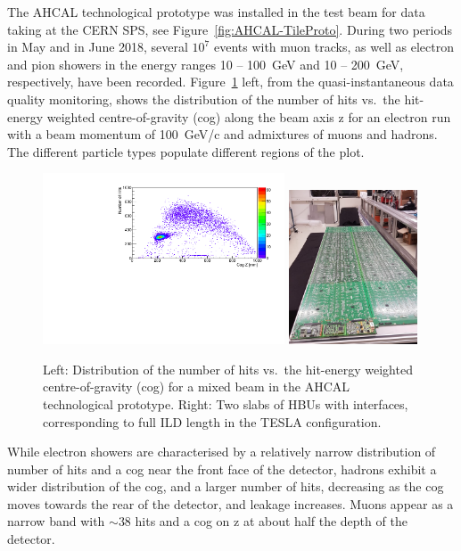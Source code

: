 The AHCAL technological prototype was installed in the test beam for data taking at the CERN SPS, see Figure~\ref{fig:AHCAL-TileProto}.
During two periods in May and in June 2018, several $10^7$ events with muon tracks, as well as electron and pion showers in the energy ranges  10 -- 100~GeV and 10 -- 200~GeV, respectively, have been recorded. 
Figure~\ref{fig:AHCAL-nhit-longslab} left, from the quasi-instantaneous data quality monitoring, shows the distribution of the number of hits vs.\ the hit-energy weighted centre-of-gravity (cog) along the beam axis z for an electron run with a beam momentum of 100~GeV/c and admixtures of muons and hadrons. The different particle types populate different regions of the plot.
\begin{figure}[hbt]
\centering
\includegraphics[width=0.64\textwidth]{Detector/fig/AHCAL-cogz_nhits.pdf}
\includegraphics[width=0.34\textwidth]{Detector/fig/AHCAL-LomgSlab.jpeg}
\caption{Left: Distribution of the number of hits vs.\ the hit-energy weighted centre-of-gravity (cog) for a mixed beam in the AHCAL technological prototype. Right: Two slabs of HBUs with interfaces, corresponding to full ILD length in the TESLA configuration.} 
\label{fig:AHCAL-nhit-longslab}
\end{figure}
%
While electron showers are characterised by a relatively narrow distribution of number of hits and a cog near the front face of the detector, hadrons exhibit a wider distribution of the cog, and a larger number of hits, decreasing as the cog moves towards the rear of the detector, and leakage increases.
Muons appear as a narrow band with $\sim 38$ hits and a cog on z at about half the depth of the detector. 


